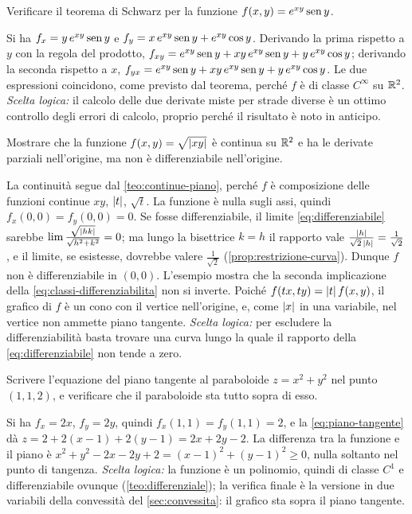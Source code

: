 \begin{esercizio}
Verificare il teorema di Schwarz per la funzione $f(x,y)=e^{xy}\operatorname{sen} y$.
\begin{soluzione}
Si ha $f_{x}=y\,e^{xy}\operatorname{sen} y$ e $f_{y}=x\,e^{xy}\operatorname{sen} y+e^{xy}\cos y$. Derivando la prima
rispetto a $y$ con la regola del prodotto,
$f_{xy}=e^{xy}\operatorname{sen} y+xy\,e^{xy}\operatorname{sen} y+y\,e^{xy}\cos y$; derivando la seconda rispetto a $x$,
$f_{yx}=e^{xy}\operatorname{sen} y+xy\,e^{xy}\operatorname{sen} y+y\,e^{xy}\cos y$. Le due espressioni coincidono, come
previsto dal teorema, perché $f$ è di classe $C^{\infty}$ su $\mathbb{R}^{2}$.
\emph{Scelta logica:} il calcolo delle due derivate miste per strade diverse è un
ottimo controllo
degli errori di calcolo, proprio perché il risultato è noto in anticipo.
\end{soluzione}
\end{esercizio}

\begin{esercizio}\label{es:non-differenziabile}
Mostrare che la funzione $f(x,y)=\sqrt{\lvert xy\rvert}$ è continua su $\mathbb{R}^{2}$ e ha le derivate
parziali nell'origine, ma non è differenziabile nell'origine.
\begin{soluzione}
La continuità segue dal \cref{teo:continue-piano}, perché $f$ è composizione delle
funzioni continue $xy$, $\lvert t\rvert$, $\sqrt t$. La funzione è nulla sugli assi, quindi
$f_{x}(0,0)=f_{y}(0,0)=0$. Se fosse differenziabile, il limite
\eqref{eq:differenziabile} sarebbe $\lim\frac{\sqrt{\lvert hk\rvert}}{\sqrt{h^{2}+k^{2}}}=0$; ma lungo la
bisettrice $k=h$ il rapporto vale $\frac{\lvert h\rvert}{\sqrt2\,\lvert h\rvert}=\frac1{\sqrt2}$, e il limite, se
esistesse, dovrebbe valere $\frac1{\sqrt2}$ (\cref{prop:restrizione-curva}). Dunque $f$ non
è differenziabile in $(0,0)$. L'esempio mostra che la seconda implicazione della
\eqref{eq:classi-differenziabilita} non si inverte. Poiché $f(tx,ty)=\lvert t\rvert\,f(x,y)$, il
grafico di $f$ è un cono con il vertice nell'origine, e, come $\lvert x\rvert$ in una variabile,
nel vertice non ammette piano tangente.
\emph{Scelta logica:} per escludere la differenziabilità basta trovare una curva lungo
la quale il rapporto della \eqref{eq:differenziabile} non tende a zero.
\end{soluzione}
\end{esercizio}

\begin{esercizio}
Scrivere l'equazione del piano tangente al paraboloide $z=x^{2}+y^{2}$ nel punto
$(1,1,2)$, e verificare che il paraboloide sta tutto sopra di esso.
\begin{soluzione}
Si ha $f_{x}=2x$, $f_{y}=2y$, quindi $f_{x}(1,1)=f_{y}(1,1)=2$, e la
\eqref{eq:piano-tangente} dà $z=2+2(x-1)+2(y-1)=2x+2y-2$. La differenza tra la funzione e
il piano è $x^{2}+y^{2}-2x-2y+2=(x-1)^{2}+(y-1)^{2}\ge0$, nulla soltanto nel punto di
tangenza. \emph{Scelta logica:} la funzione è un polinomio, quindi di classe $C^{1}$ e
differenziabile ovunque (\cref{teo:differenziale}); la verifica finale è la versione in
due variabili della convessità del \cref{sec:convessita}: il grafico sta sopra il piano
tangente.
\end{soluzione}
\end{esercizio}

